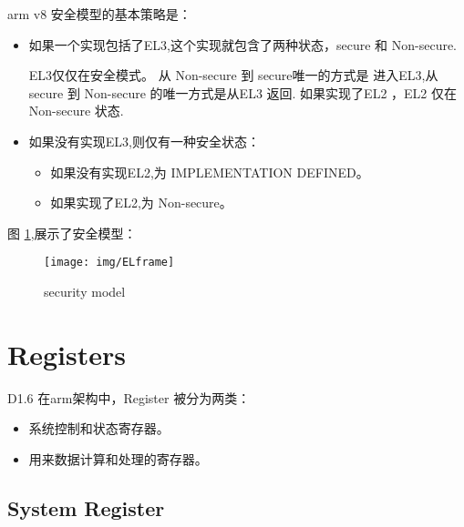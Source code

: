 arm v8 安全模型的基本策略是：

\begin{itemize}

\item 如果一个实现包括了EL3,这个实现就包含了两种状态，secure 和 Non-secure.

EL3仅仅在安全模式。 从 Non-secure 到 secure唯一的方式是  进入EL3,从secure 到 Non-secure 的唯一方式是从EL3 返回.
如果实现了EL2 ，EL2 仅在Non-secure 状态.

\item 如果没有实现EL3,则仅有一种安全状态：
\begin{itemize}

\item 如果没有实现EL2,为 IMPLEMENTATION DEFINED。 

\item 如果实现了EL2,为 Non-secure。
\end{itemize}

\end{itemize}

图 \ref{sec_mod},展示了安全模型：

\begin{figure}
\begin{center}
\texttt{[image: img/ELframe]}
\caption{security model}
\label{sec_mod}
\end{center}
\vspace{-0.5em}
\end{figure}


\section{Registers}
D1.6
在arm架构中，Register 被分为两类：

\begin{itemize}
\item 系统控制和状态寄存器。

\item 用来数据计算和处理的寄存器。
\end{itemize}

\subsection{System Register}


\subsection{}



